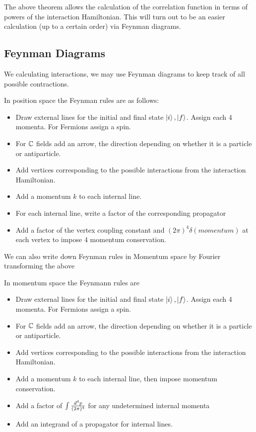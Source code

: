 \documentclass{article}
\begin{document}
\begin{idea}
The above theorem allows the calculation of the correlation function in terms of powers of the interaction Hamiltonian. This will turn out to be an easier calculation (up to a certain order) via Feynman diagrams. 
\end{idea}

\subsection{Feynman Diagrams}

We calculating interactions, we may use Feynman diagrams to keep track of all possible contractions. 

\begin{theorem}
In position space the Feynman rules are as follows: 
\begin{itemize}
    \item Draw external lines for the initial and final state $\ket{i}, \ket{f}$. Assign each 4 momenta. For Fermions assign a spin. 
    \item For $\mathbb{C}$ fields add an arrow, the direction depending on whether it is a particle or antiparticle. 
    \item Add vertices corresponding to the possible interactions from the interaction Hamiltonian. 
    \item Add a momentum $k$ to each internal line. 
    \item For each internal line, write a factor of the corresponding propagator
    \item Add a factor of the vertex coupling constant and $(2\pi)^4 \delta(momentum)$ at each vertex to impose 4 momentum conservation. 
\end{itemize}
\end{theorem}

We can also write down Feynman rules in Momentum space by Fourier transforming the above 

\begin{theorem}
In momentum space the Feynmann rules are 
\begin{itemize}
\item Draw external lines for the initial and final state $\ket{i}, \ket{f}$. Assign each 4 momenta. For Fermions assign a spin. 
    \item For $\mathbb{C}$ fields add an arrow, the direction depending on whether it is a particle or antiparticle. 
    \item Add vertices corresponding to the possible interactions from the interaction Hamiltonian. 
    \item Add a momentum $k$ to each internal line, then impose momentum conservation. 
    \item Add a factor of $\int \frac{d^4p}{(2\pi)^4}$ for any undetermined internal momenta 
    \item Add an integrand of a propagator for internal lines. 
\end{itemize}
\end{theorem}
\end{document}
